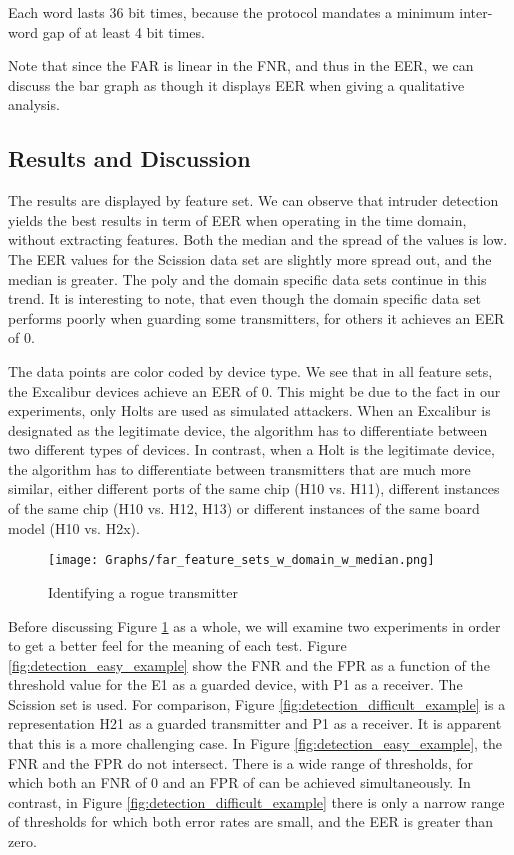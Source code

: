 \documentclass[conference]{IEEEtran}
\begin{document}
  Each word lasts 36 bit times, because the protocol mandates a minimum inter-word gap of at least 4 bit times.
  
  Note that since the FAR is linear in the FNR, and thus in the EER, we can discuss the bar graph as though it displays EER when giving a qualitative analysis.
  
\subsection{Results and Discussion}
  The results are displayed by feature set. We can observe that intruder detection yields the best results in term of EER when operating in the time domain, without extracting features. Both the median and the spread of the values is low. The EER values for the Scission data set are slightly more spread out, and the median is greater. The poly and the domain specific data sets continue in this trend. It is interesting to note, that even though the domain specific data set performs poorly when guarding some transmitters, for others it achieves an EER of 0.
  
  The data points are color coded by device type. We see that in all feature sets, the Excalibur devices achieve an EER of 0. This might be due to the fact in our experiments, only Holts are used as simulated attackers. When an Excalibur is designated as the legitimate device, the algorithm has to differentiate between two different types of devices. In contrast, when a Holt is the legitimate device, the algorithm has to differentiate between transmitters that are much more similar, either different ports of the same chip (H10 vs. H11), different instances of the same chip (H10 vs. H12, H13) or different instances of the same board model (H10 vs. H2x).
  
  \begin{figure}[t]
    \centering
    \texttt{[image: Graphs/far\_feature\_sets\_w\_domain\_w\_median.png]}
    \caption{Identifying a rogue transmitter}
    \label{fig:rogue_transmitter_results}
  \end{figure}
  
  Before discussing Figure \ref{fig:rogue_transmitter_results} as a whole, we will examine two experiments in order to get a better feel for the meaning of each test. Figure \ref{fig:detection_easy_example} show the FNR and the FPR as a function of the threshold value for the E1 as a guarded device, with P1 as a receiver. The Scission set is used. For comparison, Figure \ref{fig:detection_difficult_example} is a representation H21 as a guarded transmitter and P1 as a receiver. It is apparent that this is a more challenging case. In Figure \ref{fig:detection_easy_example}, the FNR and the FPR do not intersect. There is a wide range of thresholds, for which both an FNR of 0 and an FPR of can be achieved simultaneously. In contrast, in Figure \ref{fig:detection_difficult_example} there is only a narrow range of thresholds for which both error rates are small, and the EER is greater than zero.
  
\end{document}
